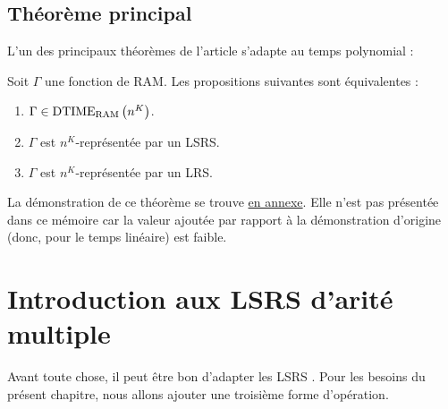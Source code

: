 		\subsection{Théorème principal}
		\label{sec:theorem_principal_grandjean_schwentick}
		
		L'un des principaux théorèmes de l'article \cite{GrandjeanSchwentick2002} s'adapte au temps polynomial :
		
		\begin{conj}
			\label{conj:main_big_theorem}
			Soit $\Gamma$ une fonction de RAM. Les propositions suivantes sont équivalentes :
			
			\begin{enumerate}[itemsep=-1mm]
				\item 	\label{num:main_gamma_in_nk}
				$\Gamma \in \text{DTIME}_{\text{RAM}}\left( n^{K} \right)$.
				
				\item 	\label{num:main_gamma_nk_rep_LSRS}
				$\Gamma$ est $n^K$-représentée par un LSRS.
				
				\item	\label{num:main_gamma_nk_rep_LRS}
				$\Gamma$ est $n^K$-représentée par un LRS.
			\end{enumerate}
		\end{conj}
		
		La démonstration de ce théorème se trouve \hyperref[sec:LRS_et_temps_poly]{en annexe}. Elle n'est pas présentée dans ce mémoire car la valeur ajoutée par rapport à la démonstration d'origine (donc, pour le temps linéaire) est faible. 
		
		
	
	
	\section{Introduction aux LSRS d'arité multiple}
	\label{sec:rintroduction}
	
		Avant toute chose, il peut être bon d'adapter les LSRS \cite{Schwentick1997} \cite{GrandjeanSchwentick2002}. Pour les besoins du présent chapitre, nous allons ajouter une troisième forme d'opération.
		
